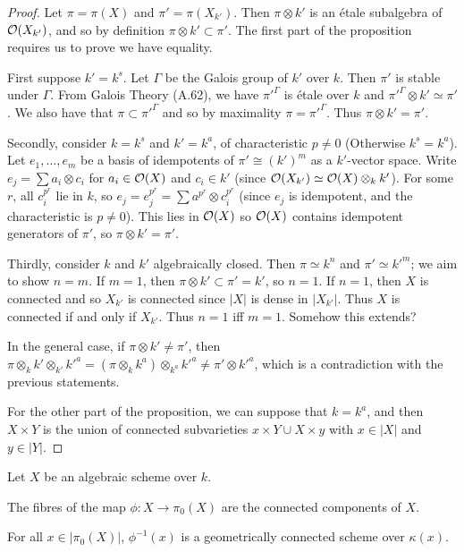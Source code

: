 \documentclass{memoir}
\begin{document}
\begin{proof}
	Let $\pi = \pi(X)$ and $\pi' = \pi(X_{k'})$. Then $\pi \otimes k'$
	is an étale subalgebra of $\mathcal{O}(X_{k'})$, and so by definition
	$\pi \otimes k' \subset \pi'$. The first part of the proposition
	requires us to prove we have equality.
	
	First suppose $k' = k^s$. Let $\Gamma$ be the Galois group of $k'$ over
	$k$. Then $\pi'$ is stable under $\Gamma$. From Galois Theory (A.62),
	we have $\pi'^\Gamma$ is étale over $k$ and
	$\pi'^\Gamma \otimes k' \simeq \pi'$. We also have that
	$\pi \subset \pi'^\Gamma$ and so by maximality $\pi = \pi'^\Gamma$.
	Thus $\pi \otimes k' = \pi'$.
	
	Secondly, consider $k = k^s$ and $k' = k^a$, of characteristic $p \ne 0$
	(Otherwise $k^s=k^a$). Let $e_1, \ldots, e_m$ be a basis of idempotents
	of $\pi'\cong (k')^m$ as a $k'$-vector space. Write
	$e_j = \sum a_i \otimes c_i$ for $a_i \in \mathcal{O}(X)$ and $c_i \in k'$
	(since $\mathcal{O}(X_{k'}) \simeq \mathcal{O}(X)\otimes_k k'$). For some $r$, all
	$c_i^{p^r}$ lie in $k$, so $e_j = e_j^{p^r} =
	\sum a^{p^r} \otimes c_i^{p^r}$ (since $e_j$ is idempotent, and the
	characteristic is $p \ne 0$). This lies in $\mathcal{O}(X)$ so $\mathcal{O}(X)$ contains
	idempotent generators of $\pi'$, so $\pi \otimes k' = \pi'$.
	
	Thirdly, consider $k$ and $k'$ algebraically closed. Then
	$\pi\simeq k^n$ and $\pi'\simeq k'^m$; we aim to show $n=m$.
	If $m = 1$, then $\pi \otimes k' \subset \pi' = k'$, so $n=1$.
	If $n=1$, then $X$ is connected and so $X_{k'}$ is connected since
	$|X|$ is dense in $|X_{k'}|$. Thus $X$ is connected if and only if
	$X_{k'}$. Thus $n=1$ iff $m=1$. Somehow this extends?
	
	In the general case, if $\pi \otimes k' \ne \pi'$, then
	$\pi \otimes_k k' \otimes_{k'} k'^a = (\pi \otimes_k k^a)
	\otimes_{k^a} k'^a \ne \pi' \otimes k'^a$, which is a contradiction
	with the previous statements.
	
	For the other part of the proposition, we can suppose that $k = k^a$,
	and then $X \times Y$ is the union of connected subvarieties
	${x}\times Y \cup X \times {y}$ with $x \in |X|$ and $y\in |Y|$.
	
\end{proof}



\begin{proposition}[1.31]
	Let $X$ be an algebraic scheme over $k$.
	
	The fibres of the map $\phi: X \to \pi_0(X)$ are the connected
	components of $X$.
	
	For all $x \in |\pi_0(X)|$, $\phi^{-1}(x)$ is a geometrically
	connected scheme over $\kappa(x)$.
\end{proposition}
\end{document}
